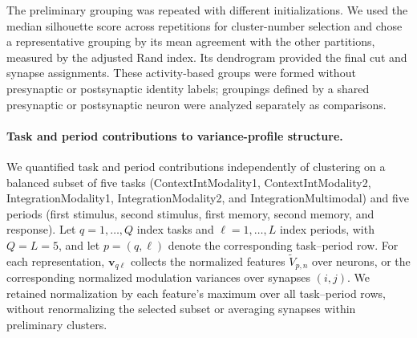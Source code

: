 \documentclass{article}
\begin{document}
The preliminary grouping was repeated with different initializations.
We used the median silhouette score across repetitions for cluster-number
selection and chose a representative grouping by its mean agreement with
the other partitions, measured by the adjusted Rand index. Its dendrogram
provided the final cut and synapse assignments. These activity-based
groups were formed without presynaptic or postsynaptic identity labels;
groupings defined by a shared presynaptic or postsynaptic neuron were
analyzed separately as comparisons.

\paragraph{Task and period contributions to variance-profile structure.}
We quantified task and period contributions independently of clustering on
a balanced subset of five tasks (ContextIntModality1, ContextIntModality2,
IntegrationModality1, IntegrationModality2, and IntegrationMultimodal) and
five periods (first stimulus, second stimulus, first memory, second memory,
and response). Let $q=1,\ldots,Q$ index tasks and $\ell=1,\ldots,L$ index
periods, with $Q=L=5$, and let $p=(q,\ell)$ denote the corresponding
task--period row. For each representation, $\mathbf{v}_{q\ell}$ collects
the normalized features $\widetilde{V}_{p,n}$ over neurons, or the
corresponding normalized modulation variances over synapses $(i,j)$.
We retained normalization by each feature's maximum over all task--period
rows, without renormalizing the selected subset or averaging synapses
within preliminary clusters.
\end{document}
